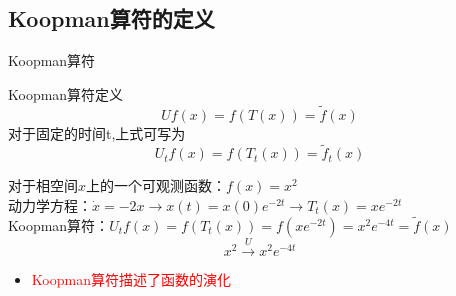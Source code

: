 \documentclass{beamer}
\begin{document}
	\subsection{Koopman算符的定义}
			\begin{frame}{Koopman算符}
			\begin{block}{Koopman算符定义}
				$$Uf\left( x\right)=f\left(T\left( x\right)\right)=\tilde{f}\left( x\right)$$
				对于固定的时间t,上式可写为
				$$U_tf\left( x\right)=f\left(T_t\left( x\right)\right)=\tilde{f}_t\left( x\right)$$
			\end{block}
			\begin{example}
			    对于相空间$x$上的一个可观测函数：$f(x)=x^2$\\
				动力学方程：$\dot{x}=-2x \rightarrow x(t)=x(0)e^{-2t} \rightarrow T_t(x)=xe^{-2t}$\\
				Koopman算符：$U_tf(x)=f(T_t(x))=f(xe^{-2t})=x^2e^{-4t}=\tilde{f}(x)$\\
				$$x^2 \stackrel{U}{\longrightarrow} x^2e^{-4t}$$
			\end{example}	
			\begin{itemize}
				\item 	\textcolor{red}{Koopman算符描述了函数的演化}
			\end{itemize}
			\end{frame}
\end{document}
